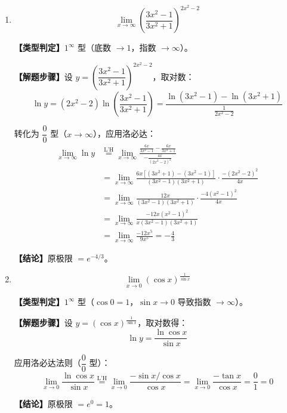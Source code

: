 \documentclass[12pt, a4paper]{ctexart}
\newcommand{\lqq}{\left(}
\newcommand{\rqq}{\right)}
\newcommand{\lh}{\stackrel{\text{L'H}}{=}}  %
\begin{document}
\begin{enumerate}[label=\textbf{\Large 第\arabic*题}, leftmargin=0pt, itemsep=2em]
\textcolor{blue}{（原解答得 $-1$ 是因错误地将分母展开为 $-\frac{1}{2}x^3$ 所致）}

\item 
\begin{tcolorbox}[colback=gray!5,colframe=gray!50!black,title=原题]
\[
\lim_{x \to \infty} \left( \frac{3x^2-1}{3x^2+1} \right)^{2x^2-2}
\]
\end{tcolorbox}

\textbf{【类型判定】}$1^{\infty}$ 型（底数 $\to 1$，指数 $\to \infty$）。

\textbf{【解题步骤】}设 $y = \lqq \dfrac{3x^2-1}{3x^2+1} \rqq^{2x^2-2}$，取对数：
\[
\ln y = (2x^2-2)\ln\left(\frac{3x^2-1}{3x^2+1}\right) = \frac{\ln(3x^2-1) - \ln(3x^2+1)}{\frac{1}{2x^2-2}}
\]

转化为 $\dfrac{0}{0}$ 型（$x\to\infty$），应用洛必达：
\begin{align*}
\lim_{x \to \infty} \ln y 
&\lh \lim_{x \to \infty} \frac{\frac{6x}{3x^2-1} - \frac{6x}{3x^2+1}}{-\frac{4x}{(2x^2-2)^2}} \\
&= \lim_{x \to \infty} \frac{6x[(3x^2+1)-(3x^2-1)]}{(3x^2-1)(3x^2+1)} \cdot \frac{-(2x^2-2)^2}{4x} \\
&= \lim_{x \to \infty} \frac{12x}{(3x^2-1)(3x^2+1)} \cdot \frac{-4(x^2-1)^2}{4x} \\
&= \lim_{x \to \infty} \frac{-12x(x^2-1)^2}{x(3x^2-1)(3x^2+1)} \\
&= \lim_{x \to \infty} \frac{-12x^5}{9x^5} = -\frac{4}{3}
\end{align*}

\textbf{【结论】}原极限 $= e^{-4/3}$。

\item 
\begin{tcolorbox}[colback=gray!5,colframe=gray!50!black,title=原题]
\[
\lim_{x \to 0} (\cos x)^{\frac{1}{\sin x}}
\]
\end{tcolorbox}

\textbf{【类型判定】}$1^{\infty}$ 型（$\cos 0 = 1$，$\sin x \to 0$ 导致指数 $\to \infty$）。

\textbf{【解题步骤】}设 $y = (\cos x)^{\frac{1}{\sin x}}$，取对数得：
\[
\ln y = \frac{\ln \cos x}{\sin x}
\]

应用洛必达法则（$\dfrac{0}{0}$ 型）：
\[
\lim_{x \to 0} \frac{\ln \cos x}{\sin x} 
\lh \lim_{x \to 0} \frac{-\sin x/\cos x}{\cos x} 
= \lim_{x \to 0} \frac{-\tan x}{\cos x} = \frac{0}{1} = 0
\]

\textbf{【结论】}原极限 $= e^0 = \boxed{1}$。


\end{enumerate}
\end{document}
